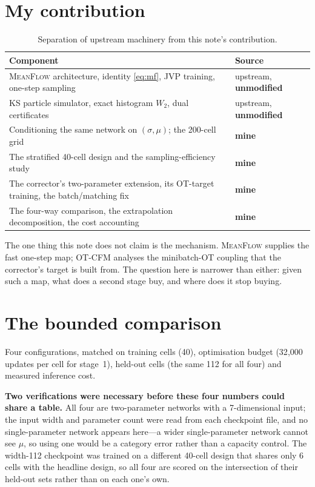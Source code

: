 ﻿\documentclass[11pt,a4paper]{article}
\newcommand{\Wtwo}{W_2}
\newcommand{\MF}{\textsc{MeanFlow}}
\begin{document}
\section{My contribution}

\begin{table}[h]
\centering\small
\begin{tabular}{@{}p{}p{}@{}}
\toprule
Component & Source \\
\midrule
\MF{} architecture, identity \eqref{eq:mf}, JVP training, one-step sampling & upstream,
  \textbf{unmodified} \\
KS particle simulator, exact histogram $\Wtwo$, dual certificates & upstream,
  \textbf{unmodified} \\
Conditioning the same network on $(\sigma,\mu)$; the 200-cell grid & \textbf{mine} \\
The stratified 40-cell design and the sampling-efficiency study & \textbf{mine} \\
The corrector's two-parameter extension, its OT-target training, the batch/matching fix &
  \textbf{mine} \\
The four-way comparison, the extrapolation decomposition, the cost accounting & \textbf{mine} \\
\bottomrule
\end{tabular}
\caption{Separation of upstream machinery from this note's contribution.}
\end{table}

The one thing this note does not claim is the mechanism. \MF{} supplies the fast one-step map;
OT-CFM analyses the minibatch-OT coupling that the corrector's target is built from. The question
here is narrower than either: given such a map, what does a second stage buy, and where does it
stop buying.

\section{The bounded comparison}
\label{sec:fourway}

Four configurations, matched on training cells (40), optimisation budget (32{,}000 updates per cell
for stage~1), held-out cells (the same 112 for all four) and measured inference cost.

\textbf{Two verifications were necessary before these four numbers could share a table.} All four
are two-parameter networks with a 7-dimensional input; the input width and parameter count were read
from each checkpoint file, and no single-parameter network appears here---a wider single-parameter
network cannot see $\mu$, so using one would be a category error rather than a capacity control. The
width-112 checkpoint was trained on a different 40-cell design that shares only 6 cells with the
headline design, so all four are scored on the intersection of their held-out sets rather than on
each one's own.
\end{document}
